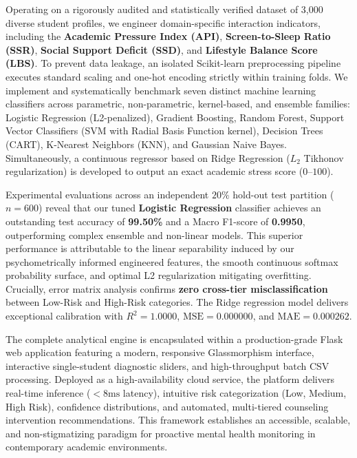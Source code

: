 \documentclass[12pt,a4paper,oneside]{report}
\begin{document}
Operating on a rigorously audited and statistically verified dataset of 3,000 diverse student profiles, we engineer domain-specific interaction indicators, including the \textbf{Academic Pressure Index (API)}, \textbf{Screen-to-Sleep Ratio (SSR)}, \textbf{Social Support Deficit (SSD)}, and \textbf{Lifestyle Balance Score (LBS)}. To prevent data leakage, an isolated Scikit-learn preprocessing pipeline executes standard scaling and one-hot encoding strictly within training folds. We implement and systematically benchmark seven distinct machine learning classifiers across parametric, non-parametric, kernel-based, and ensemble families: Logistic Regression (L2-penalized), Gradient Boosting, Random Forest, Support Vector Classifiers (SVM with Radial Basis Function kernel), Decision Trees (CART), K-Nearest Neighbors (KNN), and Gaussian Naive Bayes. Simultaneously, a continuous regressor based on Ridge Regression ($L_2$ Tikhonov regularization) is developed to output an exact academic stress score ($0$--$100$).

Experimental evaluations across an independent $20\%$ hold-out test partition ($n=600$) reveal that our tuned \textbf{Logistic Regression} classifier achieves an outstanding test accuracy of \textbf{99.50\%} and a Macro F1-score of \textbf{0.9950}, outperforming complex ensemble and non-linear models. This superior performance is attributable to the linear separability induced by our psychometrically informed engineered features, the smooth continuous softmax probability surface, and optimal L2 regularization mitigating overfitting. Crucially, error matrix analysis confirms \textbf{zero cross-tier misclassification} between Low-Risk and High-Risk categories. The Ridge regression model delivers exceptional calibration with $R^2 = 1.0000$, $\text{MSE} = 0.000000$, and $\text{MAE} = 0.000262$. 

The complete analytical engine is encapsulated within a production-grade Flask web application featuring a modern, responsive Glassmorphism interface, interactive single-student diagnostic sliders, and high-throughput batch CSV processing. Deployed as a high-availability cloud service, the platform delivers real-time inference ($<8\text{ms}$ latency), intuitive risk categorization (Low, Medium, High Risk), confidence distributions, and automated, multi-tiered counseling intervention recommendations. This framework establishes an accessible, scalable, and non-stigmatizing paradigm for proactive mental health monitoring in contemporary academic environments.
\end{document}
